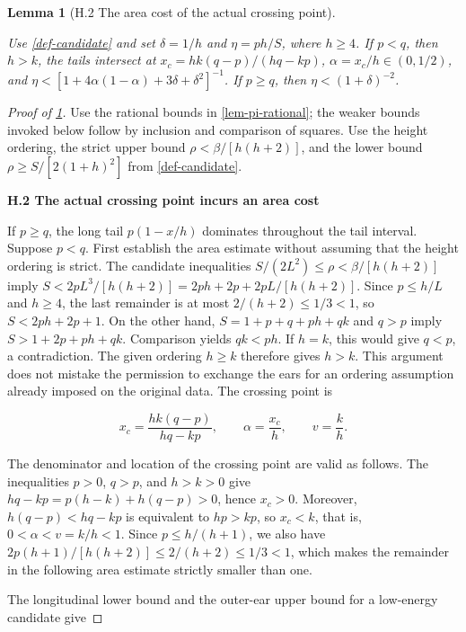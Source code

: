 \documentclass[11pt,a4paper]{article}
\theoremstyle{proofmanuscript}
\newtheorem{lemma}[theorem]{Lemma}
\begin{document}
\begin{lemma}[H.2 The area cost of the actual crossing point]\label{lem-high-area-cost}

Use \ref{def-candidate} and set \(\delta=1/h\) and \(\eta=ph/S\), where \(h\ge4\). If \(p<q\), then \(h>k\), the tails intersect at \(x_c=hk(q-p)/(hq-kp)\), \(\alpha=x_c/h\in(0,1/2)\), and \(\eta<[1+4\alpha(1-\alpha)+3\delta+\delta^2]^{-1}\). If \(p\ge q\), then \(\eta<(1+\delta)^{-2}\).

\end{lemma}

\begin{proof}[Proof of \ref{lem-high-area-cost}]

Use the rational bounds in \ref{lem-pi-rational}; the weaker bounds invoked below follow by inclusion and comparison of squares. Use the height ordering, the strict upper bound \(\rho<\beta/[h(h+2)]\), and the lower bound \(\rho\ge S/[2(1+h)^2]\) from \ref{def-candidate}.

\textbf{H.2 The actual crossing point incurs an area cost}

If \(p\ge q\), the long tail \(p(1-x/h)\) dominates throughout the tail interval. Suppose \(p<q\). First establish the area estimate without assuming that the height ordering is strict. The candidate inequalities \(S/(2L^2)\le\rho<\beta/[h(h+2)]\) imply \(S<2pL^3/[h(h+2)]=2ph+2p+2pL/[h(h+2)]\). Since \(p\le h/L\) and \(h\ge4\), the last remainder is at most \(2/(h+2)\le1/3<1\), so \(S<2ph+2p+1\). On the other hand, \(S=1+p+q+ph+qk\) and \(q>p\) imply \(S>1+2p+ph+qk\). Comparison yields \(qk<ph\). If \(h=k\), this would give \(q<p\), a contradiction. The given ordering \(h\ge k\) therefore gives \(h>k\). This argument does not mistake the permission to exchange the ears for an ordering assumption already imposed on the original data. The crossing point is

\[
x_c=\frac{hk(q-p)}{hq-kp},\qquad
\alpha=\frac{x_c}{h},\qquad v=\frac kh.
\tag{H.2.1}
\]

The denominator and location of the crossing point are valid as follows. The inequalities \(p>0\), \(q>p\), and \(h>k>0\) give \(hq-kp=p(h-k)+h(q-p)>0\), hence \(x_c>0\). Moreover, \(h(q-p)<hq-kp\) is equivalent to \(hp>kp\), so \(x_c<k\), that is, \(0<\alpha<v=k/h<1\). Since \(p\le h/(h+1)\), we also have \(2p(h+1)/[h(h+2)]\le2/(h+2)\le1/3<1\), which makes the remainder in the following area estimate strictly smaller than one.

The longitudinal lower bound and the outer-ear upper bound for a low-energy candidate give


\end{proof}
\end{document}
